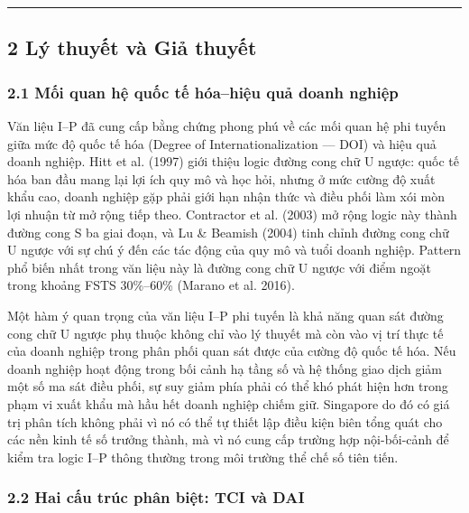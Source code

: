\documentclass[12pt,a4paper]{article}
\begin{document}
\begin{center}\rule{0.5\linewidth}{0.5pt}\end{center}

\hypertarget{2-luxfd-thuyux1ebft-vuxe0-giux1ea3-thuyux1ebft}{%
\subsection{2 Lý thuyết và Giả
thuyết}\label{2-luxfd-thuyux1ebft-vuxe0-giux1ea3-thuyux1ebft}}

\hypertarget{21-mux1ed1i-quan-hux1ec7-quux1ed1c-tux1ebf-huxf3ahiux1ec7u-quux1ea3-doanh-nghiux1ec7p}{%
\subsubsection{2.1 Mối quan hệ quốc tế hóa--hiệu quả doanh
nghiệp}\label{21-mux1ed1i-quan-hux1ec7-quux1ed1c-tux1ebf-huxf3ahiux1ec7u-quux1ea3-doanh-nghiux1ec7p}}

Văn liệu I--P đã cung cấp bằng chứng phong phú về các mối quan hệ phi
tuyến giữa mức độ quốc tế hóa (Degree of Internationalization --- DOI)
và hiệu quả doanh nghiệp. Hitt et al. (1997) giới thiệu logic đường cong
chữ U ngược: quốc tế hóa ban đầu mang lại lợi ích quy mô và học hỏi,
nhưng ở mức cường độ xuất khẩu cao, doanh nghiệp gặp phải giới hạn nhận
thức và điều phối làm xói mòn lợi nhuận từ mở rộng tiếp theo. Contractor
et al. (2003) mở rộng logic này thành đường cong S ba giai đoạn, và Lu
\& Beamish (2004) tinh chỉnh đường cong chữ U ngược với sự chú ý đến các
tác động của quy mô và tuổi doanh nghiệp. Pattern phổ biến nhất trong
văn liệu này là đường cong chữ U ngược với điểm ngoặt trong khoảng FSTS
30\%--60\% (Marano et al. 2016).

Một hàm ý quan trọng của văn liệu I--P phi tuyến là khả năng quan sát
đường cong chữ U ngược phụ thuộc không chỉ vào lý thuyết mà còn vào vị
trí thực tế của doanh nghiệp trong phân phối quan sát được của cường độ
quốc tế hóa. Nếu doanh nghiệp hoạt động trong bối cảnh hạ tầng số và hệ
thống giao dịch giảm một số ma sát điều phối, sự suy giảm phía phải có
thể khó phát hiện hơn trong phạm vi xuất khẩu mà hầu hết doanh nghiệp
chiếm giữ. Singapore do đó có giá trị phân tích không phải vì nó có thể
tự thiết lập điều kiện biên tổng quát cho các nền kinh tế số trưởng
thành, mà vì nó cung cấp trường hợp nội-bối-cảnh để kiểm tra logic I--P
thông thường trong môi trường thể chế số tiên tiến.

\hypertarget{22-hai-cux1ea5u-truxfac-phuxe2n-biux1ec7t-tci-vuxe0-dai}{%
\subsubsection{2.2 Hai cấu trúc phân biệt: TCI và
DAI}\label{22-hai-cux1ea5u-truxfac-phuxe2n-biux1ec7t-tci-vuxe0-dai}}
\end{document}
